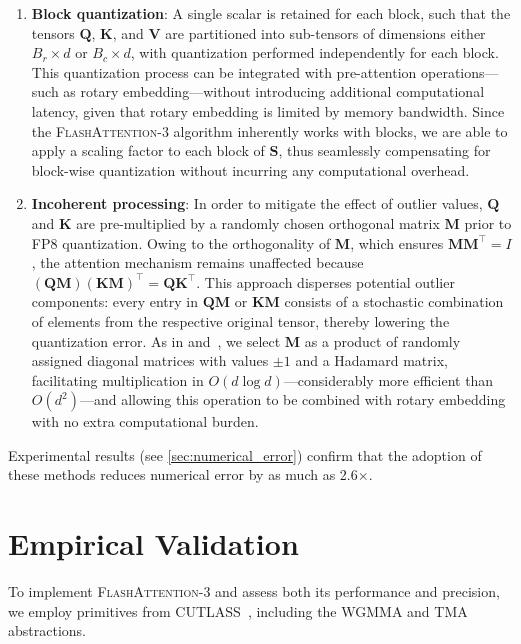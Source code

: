 \begin{enumerate}

\item \textbf{Block quantization}: A single scalar is retained for each block, such that the tensors $\mathbf{Q}$, $\mathbf{K}$, and $\mathbf{V}$ are partitioned into sub-tensors of dimensions either $B_r \times d$ or $B_c \times d$, with quantization performed independently for each block. This quantization process can be integrated with pre-attention operations—such as rotary embedding—without introducing additional computational latency, given that rotary embedding is limited by memory bandwidth. Since the \textsc{FlashAttention-3} algorithm inherently works with blocks, we are able to apply a scaling factor to each block of $\mathbf{S}$, thus seamlessly compensating for block-wise quantization without incurring any computational overhead.

\item \textbf{Incoherent processing}: In order to mitigate the effect of outlier values, $\mathbf{Q}$ and $\mathbf{K}$ are pre-multiplied by a randomly chosen orthogonal matrix $\mathbf{M}$ prior to FP8 quantization. Owing to the orthogonality of $\mathbf{M}$, which ensures $\mathbf{M} \mathbf{M}^\top = I$, the attention mechanism remains unaffected because $(\mathbf{Q} \mathbf{M}) (\mathbf{K} \mathbf{M})^\top = \mathbf{Q} \mathbf{K}^\top$. This approach disperses potential outlier components: every entry in $\mathbf{Q} \mathbf{M}$ or $\mathbf{K} \mathbf{M}$ consists of a stochastic combination of elements from the respective original tensor, thereby lowering the quantization error. As in \citet{chee2024quip} and~\citet{tseng2024quip}, we select $\mathbf{M}$ as a product of randomly assigned diagonal matrices with values $\pm 1$ and a Hadamard matrix, facilitating multiplication in $O(d \log d)$—considerably more efficient than $O(d^2)$—and allowing this operation to be combined with rotary embedding with no extra computational burden.
\end{enumerate}

Experimental results (see \cref{sec:numerical_error}) confirm that the adoption of these methods reduces numerical error by as much as 2.6$\times$.

\section{Empirical Validation}
\label{sec:exp}

To implement \textsc{FlashAttention-3} and assess both its performance and precision, we employ primitives from CUTLASS~\citep{Thakkar_CUTLASS_2023}, including the WGMMA and TMA abstractions.

